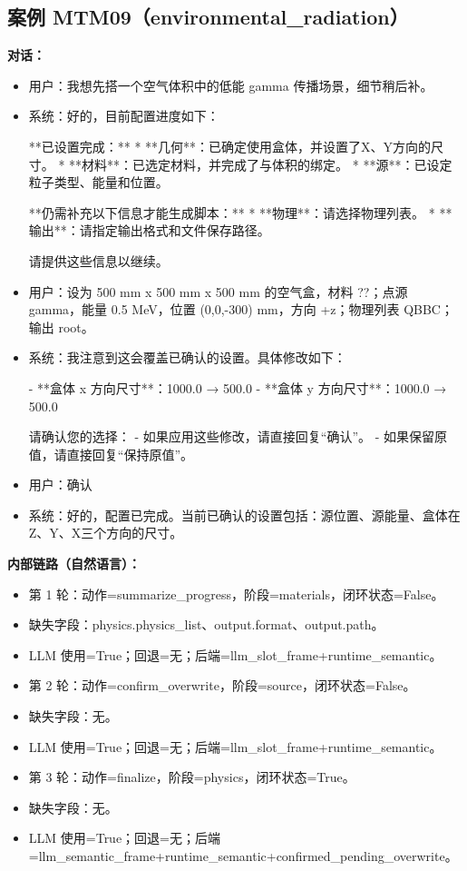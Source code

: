\documentclass[11pt]{ctexart}
\begin{document}
\subsection{案例 MTM09（environmental\_radiation）}
\textbf{对话：}
\begin{itemize}
\item 用户：我想先搭一个空气体积中的低能 gamma 传播场景，细节稍后补。
\item 系统：好的，目前配置进度如下：

**已设置完成：**
*   **几何**：已确定使用盒体，并设置了X、Y方向的尺寸。
*   **材料**：已选定材料，并完成了与体积的绑定。
*   **源**：已设定粒子类型、能量和位置。

**仍需补充以下信息才能生成脚本：**
*   **物理**：请选择物理列表。
*   **输出**：请指定输出格式和文件保存路径。

请提供这些信息以继续。
\item 用户：设为 500 mm x 500 mm x 500 mm 的空气盒，材料 ??；点源 gamma，能量 0.5 MeV，位置 (0,0,-300) mm，方向 +z；物理列表 QBBC；输出 root。
\item 系统：我注意到这会覆盖已确认的设置。具体修改如下：

- **盒体 x 方向尺寸**：1000.0 → 500.0
- **盒体 y 方向尺寸**：1000.0 → 500.0

请确认您的选择：
- 如果应用这些修改，请直接回复“确认”。
- 如果保留原值，请直接回复“保持原值”。
\item 用户：确认
\item 系统：好的，配置已完成。当前已确认的设置包括：源位置、源能量、盒体在Z、Y、X三个方向的尺寸。
\end{itemize}
\textbf{内部链路（自然语言）：}
\begin{itemize}
\item 第 1 轮：动作=summarize\_progress，阶段=materials，闭环状态=False。
\item 缺失字段：physics.physics\_list、output.format、output.path。
\item LLM 使用=True；回退=无；后端=llm\_slot\_frame+runtime\_semantic。
\item 第 2 轮：动作=confirm\_overwrite，阶段=source，闭环状态=False。
\item 缺失字段：无。
\item LLM 使用=True；回退=无；后端=llm\_slot\_frame+runtime\_semantic。
\item 第 3 轮：动作=finalize，阶段=physics，闭环状态=True。
\item 缺失字段：无。
\item LLM 使用=True；回退=无；后端=llm\_semantic\_frame+runtime\_semantic+confirmed\_pending\_overwrite。
\end{itemize}
\end{document}
